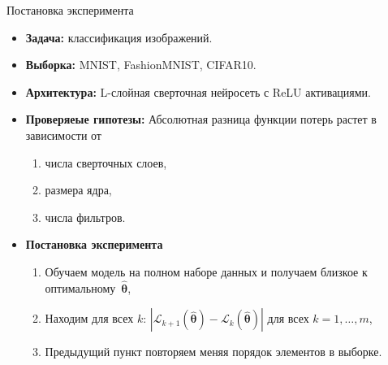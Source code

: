 \documentclass[aspectratio=169]{beamer}
\begin{document}
\begin{frame}{Постановка эксперимента}
    \begin{itemize}
        \item \textbf{Задача:} классификация изображений.
        \item \textbf{Выборка:} MNIST, FashionMNIST, CIFAR10.
        \item \textbf{Архитектура:} L-слойная сверточная нейросеть с ReLU активациями.
        \item \textbf{Проверяеые гипотезы:}
        Абсолютная разница функции потерь растет в зависимости от
        \begin{enumerate}
            \item числа сверточных слоев,
            \item размера ядра,
            \item числа фильтров.
        \end{enumerate}
        \item \textbf{Постановка эксперимента}
        \begin{enumerate}
            \item Обучаем модель на полном наборе данных и получаем близкое к оптимальному~$\hat{\boldsymbol{\theta}}$,
            \item Находим для всех $k$: $\left| \mathcal{L}_{k+1}(\hat{\boldsymbol{\theta}}) - \mathcal{L}_k(\hat{\boldsymbol{\theta}}) \right|$ для всех $k = 1, \ldots, m$,
            \item Предыдущий пункт повторяем меняя порядок элементов в выборке.
        \end{enumerate}
    \end{itemize}
\end{frame}
\end{document}

